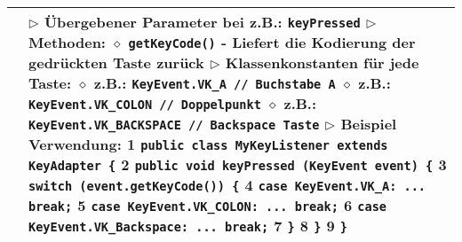 \begin{longtable}{ | p{} p{} | }
	\makecell[l]{Klasse KeyEvent} & \makecell[l]{
	$\rhd$ Übergebener Parameter bei z.B.: \texttt{keyPressed} \\
	$\rhd$ Methoden: \\
	\hspace{0.4cm} $\diamond$ \texttt{getKeyCode()} \\
	\hspace{0.6cm} - Liefert die Kodierung der gedrückten Taste zurück \\
	$\rhd$ Klassenkonstanten für jede Taste: \\
	\hspace{0.4cm} $\diamond$ z.B.: \texttt{KeyEvent.VK\_A // Buchstabe A} \\
	\hspace{0.4cm} $\diamond$ z.B.: \texttt{KeyEvent.VK\_COLON // Doppelpunkt} \\
	\hspace{0.4cm} $\diamond$ z.B.: \texttt{KeyEvent.VK\_BACKSPACE // Backspace Taste} \\
	$\rhd$ Beispiel Verwendung: \\
	\hspace{0.4cm} 1 \hspace{0.1cm} \texttt{public class MyKeyListener extends KeyAdapter \{} \\
	\hspace{0.4cm} 2 \hspace{0.5cm} \texttt{public void keyPressed (KeyEvent event) \{} \\
	\hspace{0.4cm} 3 \hspace{0.9cm} \texttt{switch (event.getKeyCode()) \{}	\\
	\hspace{0.4cm} 4 \hspace{1.3cm} \texttt{case KeyEvent.VK\_A: ... break;} \\
	\hspace{0.4cm} 5 \hspace{1.3cm} \texttt{case KeyEvent.VK\_COLON: ... break;} \\
	\hspace{0.4cm} 6 \hspace{1.3cm} \texttt{case KeyEvent.VK\_Backspace: ... break;} \\
	\hspace{0.4cm} 7 \hspace{0.9cm} \texttt{\}} \\
	\hspace{0.4cm} 8 \hspace{0.5cm} \texttt{\}} \\
	\hspace{0.4cm} 9 \hspace{0.1cm} \texttt{\}}
	} \\ \hline


\end{longtable}

